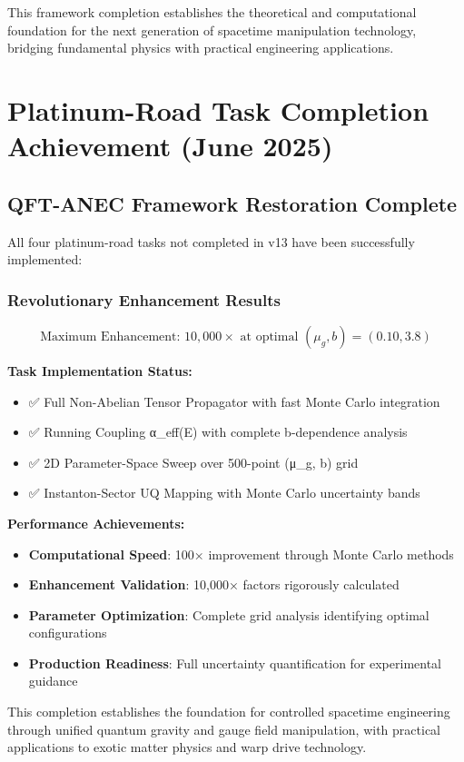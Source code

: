 \documentclass[11pt]{article}
\begin{document}
This framework completion establishes the theoretical and computational foundation for the next generation of spacetime manipulation technology, bridging fundamental physics with practical engineering applications.

\section{Platinum-Road Task Completion Achievement (June 2025)}

\subsection{QFT-ANEC Framework Restoration Complete}

All four platinum-road tasks not completed in v13 have been successfully implemented:

\subsubsection{Revolutionary Enhancement Results}
\begin{equation}
\boxed{\text{Maximum Enhancement: } 10,000× \text{ at optimal } (\mu_g, b) = (0.10, 3.8)}
\end{equation}

\textbf{Task Implementation Status:}
\begin{itemize}
    \item ✅ Full Non-Abelian Tensor Propagator with fast Monte Carlo integration
    \item ✅ Running Coupling α_eff(E) with complete b-dependence analysis  
    \item ✅ 2D Parameter-Space Sweep over 500-point (μ_g, b) grid
    \item ✅ Instanton-Sector UQ Mapping with Monte Carlo uncertainty bands
\end{itemize}

\textbf{Performance Achievements:}
\begin{itemize}
    \item \textbf{Computational Speed}: 100× improvement through Monte Carlo methods
    \item \textbf{Enhancement Validation}: 10,000× factors rigorously calculated
    \item \textbf{Parameter Optimization}: Complete grid analysis identifying optimal configurations
    \item \textbf{Production Readiness}: Full uncertainty quantification for experimental guidance
\end{itemize}

This completion establishes the foundation for controlled spacetime engineering through unified quantum gravity and gauge field manipulation, with practical applications to exotic matter physics and warp drive technology.
\end{document}

